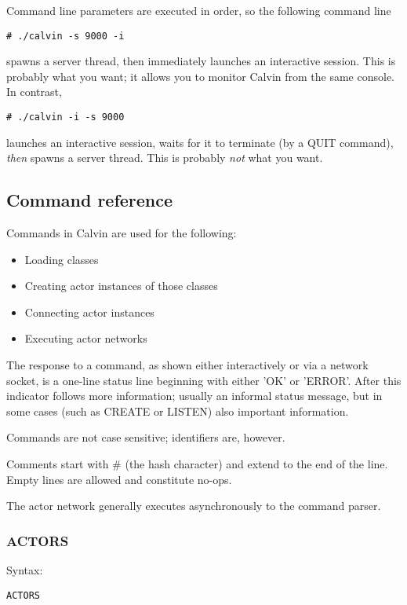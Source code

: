 \documentclass[10pt, a4paper]{article}
\begin{document}
Command line parameters are executed in order, so the following command line
\begin{verbatim}
# ./calvin -s 9000 -i
\end{verbatim}

spawns a server thread, then immediately launches an interactive
session. This is probably what you want; it allows you to monitor
Calvin from the same console. In contrast,

\begin{verbatim}
# ./calvin -i -s 9000
\end{verbatim}

launches an interactive session, waits for it to terminate (by a QUIT
command), {\em then} spawns a server thread. This is probably {\em
  not} what you want.

\subsection{Command reference}

Commands in Calvin are used for the following:

\begin{itemize}
\item Loading classes
\item Creating actor instances of those classes
\item Connecting actor instances
\item Executing actor networks
\end{itemize}

The response to a command, as shown either interactively or via a
network socket, is a one-line status line beginning with either 'OK'
or 'ERROR'. After this indicator follows more information; usually an
informal status message, but in some cases (such as CREATE or LISTEN)
also important information.

Commands are not case sensitive; identifiers are, however.

Comments start with \# (the hash character) and extend to the end of
the line. Empty lines are allowed and constitute no-ops.

The actor network generally executes asynchronously to the command
parser.

\subsubsection*{ACTORS}

Syntax:
\begin{verbatim}
ACTORS
\end{verbatim}
\end{document}
